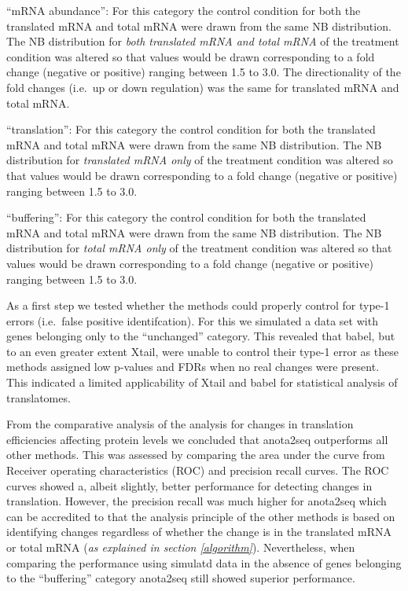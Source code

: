 \documentclass[12pt,openany]{book}
\begin{document}
``mRNA abundance'': For this category the control condition for both the
translated mRNA and total mRNA were drawn from the same NB distribution.
The NB distribution for \emph{both translated mRNA and total mRNA} of
the treatment condition was altered so that values would be drawn
corresponding to a fold change (negative or positive) ranging between
1.5 to 3.0. The directionality of the fold changes (i.e.~up or down
regulation) was the same for translated mRNA and total mRNA.

``translation'': For this category the control condition for both the
translated mRNA and total mRNA were drawn from the same NB distribution.
The NB distribution for \emph{translated mRNA only} of the treatment
condition was altered so that values would be drawn corresponding to a
fold change (negative or positive) ranging between 1.5 to 3.0.

``buffering'': For this category the control condition for both the
translated mRNA and total mRNA were drawn from the same NB distribution.
The NB distribution for \emph{total mRNA only} of the treatment
condition was altered so that values would be drawn corresponding to a
fold change (negative or positive) ranging between 1.5 to 3.0.

As a first step we tested whether the methods could properly control for
type-1 errors (i.e.~false positive identifcation). For this we simulated
a data set with genes belonging only to the ``unchanged'' category. This
revealed that babel, but to an even greater extent Xtail, were unable to
control their type-1 error as these methods assigned low p-values and
FDRs when no real changes were present. This indicated a limited
applicability of Xtail and babel for statistical analysis of
translatomes.

From the comparative analysis of the analysis for changes in translation
efficiencies affecting protein levels we concluded that anota2seq
outperforms all other methods. This was assessed by comparing the area
under the curve from Receiver operating characteristics (ROC) and
precision recall curves. The ROC curves showed a, albeit slightly,
better performance for detecting changes in translation. However, the
precision recall was much higher for anota2seq which can be accredited
to that the analysis principle of the other methods is based on
identifying changes regardless of whether the change is in the
translated mRNA or total mRNA (\emph{as explained in section
\ref{algorithm}}). Nevertheless, when comparing the performance using
simulatd data in the absence of genes belonging to the ``buffering''
category anota2seq still showed superior performance.
\end{document}
